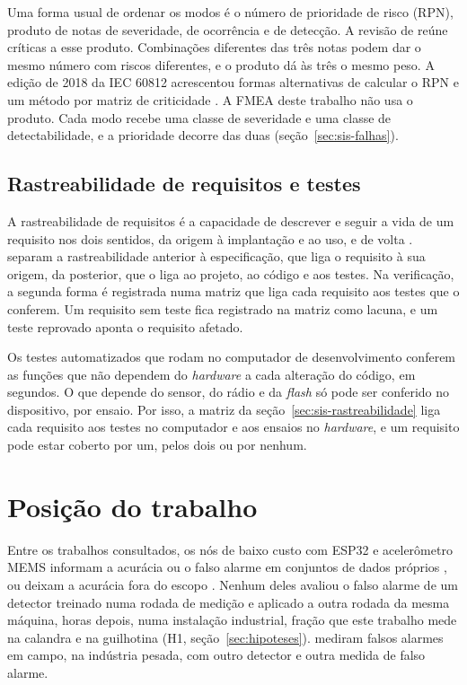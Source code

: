 Uma forma usual de ordenar os modos é o número de prioridade de risco (RPN), produto de notas de severidade, de ocorrência e de detecção. A revisão de  reúne críticas a esse produto. Combinações diferentes das três notas podem dar o mesmo número com riscos diferentes, e o produto dá às três o mesmo peso. A edição de 2018 da IEC 60812 acrescentou formas alternativas de calcular o RPN e um método por matriz de criticidade \cite{iec60812}. A FMEA deste trabalho não usa o produto. Cada modo recebe uma classe de severidade e uma classe de detectabilidade, e a prioridade decorre das duas (seção~\ref{sec:sis-falhas}).

\subsection{Rastreabilidade de requisitos e testes}\label{sec:fund-rastreabilidade}

A rastreabilidade de requisitos é a capacidade de descrever e seguir a vida de um requisito nos dois sentidos, da origem à implantação e ao uso, e de volta \cite{gotel1994}.  separam a rastreabilidade anterior à especificação, que liga o requisito à sua origem, da posterior, que o liga ao projeto, ao código e aos testes. Na verificação, a segunda forma é registrada numa matriz que liga cada requisito aos testes que o conferem. Um requisito sem teste fica registrado na matriz como lacuna, e um teste reprovado aponta o requisito afetado.

Os testes automatizados que rodam no computador de desenvolvimento conferem as funções que não dependem do \textit{hardware} a cada alteração do código, em segundos. O que depende do sensor, do rádio e da \textit{flash} só pode ser conferido no dispositivo, por ensaio. Por isso, a matriz da seção~\ref{sec:sis-rastreabilidade} liga cada requisito aos testes no computador e aos ensaios no \textit{hardware}, e um requisito pode estar coberto por um, pelos dois ou por nenhum.

\section{Posição do trabalho}\label{sec:fund-posicao}

Entre os trabalhos consultados, os nós de baixo custo com ESP32 e acelerômetro MEMS informam a acurácia ou o falso alarme em conjuntos de dados próprios \cite{chevtchenko2023,kolok2025}, ou deixam a acurácia fora do escopo \cite{antonini2023}. Nenhum deles avaliou o falso alarme de um detector treinado numa rodada de medição e aplicado a outra rodada da mesma máquina, horas depois, numa instalação industrial, fração que este trabalho mede na calandra e na guilhotina (H1, seção~\ref{sec:hipoteses}).  mediram falsos alarmes em campo, na indústria pesada, com outro detector e outra medida de falso alarme.

